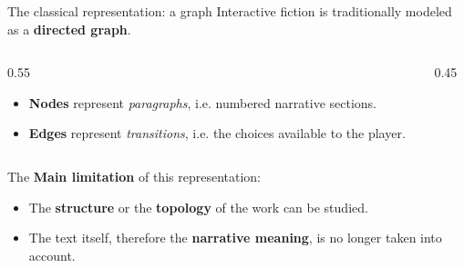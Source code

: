 \documentclass{beamer}
\newcommand{\imp}[1]{\textbf{\color{cyan}#1}}
\begin{document}
  	\begin{frame}{The classical representation: a graph}
  		Interactive fiction is traditionally modeled as a
  		\imp{directed graph}.
  	\begin{columns}[T]
  		\begin{column}{0.55\textwidth}			 			
  			\vspace{0.4cm}
  			
  			\begin{itemize}
  				\item \imp{Nodes} represent \emph{paragraphs}, i.e. numbered narrative sections.
  				\item \imp{Edges} represent \emph{transitions}, i.e. the choices available to the player.
  			\end{itemize}
  		\end{column}
  		
  		\begin{column}{0.45\textwidth}
  			\centering
  		\end{column}
  		\end{columns}
  		
  		\vfill
  		
  		The \imp{Main limitation} of this representation: 
  		\begin{itemize}
  			\item The \imp{structure} or the \imp{topology} of the work can be studied. 
  			\item The text itself, therefore the \imp{narrative meaning}, is no longer taken into account.
  		\end{itemize}
  		
  	\end{frame}
  	
\end{document}
